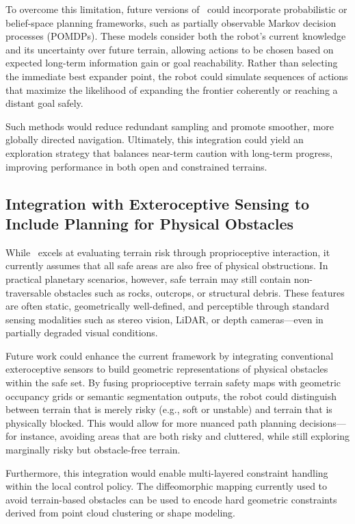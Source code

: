 To overcome this limitation, future versions of \algoname\ could incorporate probabilistic or belief-space planning frameworks, such as partially observable Markov decision processes (POMDPs). These models consider both the robot’s current knowledge and its uncertainty over future terrain, allowing actions to be chosen based on expected long-term information gain or goal reachability. Rather than selecting the immediate best expander point, the robot could simulate sequences of actions that maximize the likelihood of expanding the frontier coherently or reaching a distant goal safely.

Such methods would reduce redundant sampling and promote smoother, more globally directed navigation. Ultimately, this integration could yield an exploration strategy that balances near-term caution with long-term progress, improving performance in both open and constrained terrains.

\subsection{Integration with Exteroceptive Sensing to Include Planning for Physical Obstacles}

While \algoname\ excels at evaluating terrain risk through proprioceptive interaction, it currently assumes that all safe areas are also free of physical obstructions. In practical planetary scenarios, however, safe terrain may still contain non-traversable obstacles such as rocks, outcrops, or structural debris. These features are often static, geometrically well-defined, and perceptible through standard sensing modalities such as stereo vision, LiDAR, or depth cameras—even in partially degraded visual conditions.

Future work could enhance the current framework by integrating conventional exteroceptive sensors to build geometric representations of physical obstacles within the safe set. By fusing proprioceptive terrain safety maps with geometric occupancy grids or semantic segmentation outputs, the robot could distinguish between terrain that is merely risky (e.g., soft or unstable) and terrain that is physically blocked. This would allow for more nuanced path planning decisions—for instance, avoiding areas that are both risky and cluttered, while still exploring marginally risky but obstacle-free terrain.

Furthermore, this integration would enable multi-layered constraint handling within the local control policy. The diffeomorphic mapping currently used to avoid terrain-based obstacles can be used to encode hard geometric constraints derived from point cloud clustering or shape modeling. 

